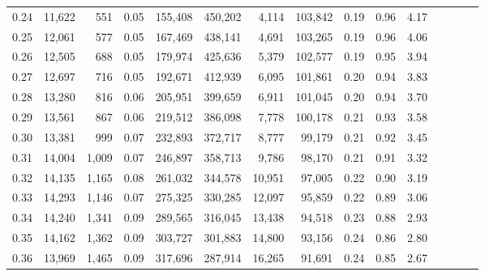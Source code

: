 \begin{tabular}{rrrcrrrrrrrrrrr}
0.24 &  11,622 &    551 &                                       0.05 &  155,408 &  450,202 &    4,114 &  103,842 &  0.19 &  0.96 &                         4.17 \\
0.25 &  12,061 &    577 &                                       0.05 &  167,469 &  438,141 &    4,691 &  103,265 &  0.19 &  0.96 &                         4.06 \\
0.26 &  12,505 &    688 &                                       0.05 &  179,974 &  425,636 &    5,379 &  102,577 &  0.19 &  0.95 &                         3.94 \\
0.27 &  12,697 &    716 &                                       0.05 &  192,671 &  412,939 &    6,095 &  101,861 &  0.20 &  0.94 &                         3.83 \\
0.28 &  13,280 &    816 &                                       0.06 &  205,951 &  399,659 &    6,911 &  101,045 &  0.20 &  0.94 &                         3.70 \\
0.29 &  13,561 &    867 &                                       0.06 &  219,512 &  386,098 &    7,778 &  100,178 &  0.21 &  0.93 &                         3.58 \\
0.30 &  13,381 &    999 &                                       0.07 &  232,893 &  372,717 &    8,777 &   99,179 &  0.21 &  0.92 &                         3.45 \\
0.31 &  14,004 &  1,009 &                                       0.07 &  246,897 &  358,713 &    9,786 &   98,170 &  0.21 &  0.91 &                         3.32 \\
0.32 &  14,135 &  1,165 &                                       0.08 &  261,032 &  344,578 &   10,951 &   97,005 &  0.22 &  0.90 &                         3.19 \\
0.33 &  14,293 &  1,146 &                                       0.07 &  275,325 &  330,285 &   12,097 &   95,859 &  0.22 &  0.89 &                         3.06 \\
0.34 &  14,240 &  1,341 &                                       0.09 &  289,565 &  316,045 &   13,438 &   94,518 &  0.23 &  0.88 &                         2.93 \\
0.35 &  14,162 &  1,362 &                                       0.09 &  303,727 &  301,883 &   14,800 &   93,156 &  0.24 &  0.86 &                         2.80 \\
0.36 &  13,969 &  1,465 &                                       0.09 &  317,696 &  287,914 &   16,265 &   91,691 &  0.24 &  0.85 &                         2.67 \\

\end{tabular}
